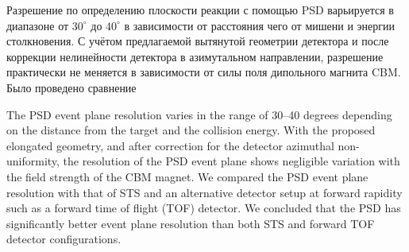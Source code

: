 Разрешение по определению плоскости реакции с помощью PSD варьируется в диапазоне от $30^\circ$ до $40^\circ$ в зависимости от расстояния \todo чего \todo от мишени и энергии столкновения. С учётом предлагаемой вытянутой геометрии детектора и после коррекции нелинейности детектора в азимутальном направлении, разрешение практически не меняется в зависимости от силы поля дипольного магнита CBM. Было проведено сравнение 

The PSD event plane resolution varies in the range of 30--40 degrees depending on the distance from
the target and the collision energy. With the proposed elongated geometry, and after correction for the
detector azimuthal non-uniformity, the resolution of the PSD event plane shows negligible variation with
the field strength of the CBM magnet. We compared the PSD event plane resolution with that of STS
and an alternative detector setup at forward rapidity such as a forward time of flight (TOF) detector. We
concluded that the PSD has significantly better event plane resolution than both STS and forward TOF
detector configurations.
